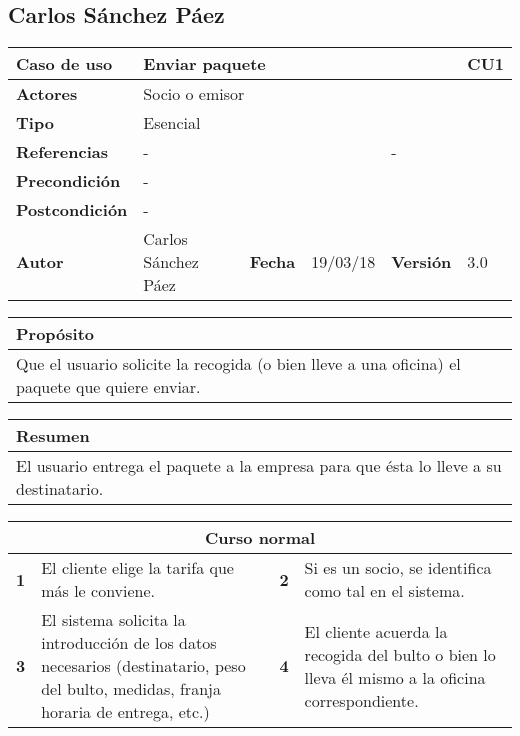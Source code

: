 \subsection{Carlos Sánchez Páez}

\begin{table}[H]
\centering
\begin{tabular}{|m{3cm}|m{4cm}|m{2cm}|m{2cm}|m{2cm}|m{1cm}|}
\hline
\textbf{Caso de uso} &  \multicolumn{4}{m{8cm}|}{Enviar paquete} \vline &  \cellcolor{gray!40}CU1 \\
\hline
\textbf{Actores} & \multicolumn{5}{m{8cm}|}{Socio o emisor} \\
\hline
\textbf{Tipo} & \multicolumn{5}{m{8cm}|}{Esencial} \\
\hline
\textbf{Referencias} &\multicolumn{3}{m{4cm}|}{-} & \multicolumn{2}{m{4cm}|}{-} \\
\hline
\textbf{Precondición} & \multicolumn{5}{m{8cm}|}{-} \\
\hline
\textbf{Postcondición} & \multicolumn{5}{m{8cm}|}{-} \\
\hline
\textbf{Autor} & Carlos Sánchez Páez & \textbf{Fecha} & 19/03/18 & \textbf{Versión} & 3.0 \\
\hline
\end{tabular}

\vspace{1cm}

\begin{tabular}{|m{16.2cm}|}
\hline
\textbf{Propósito} \\
\hline
Que el usuario solicite la recogida (o bien lleve a una oficina) el paquete que quiere enviar. \\
\hline
\end{tabular}

\vspace{1cm}

\begin{tabular}{|m{16.2cm}|}
\hline
\textbf{Resumen} \\
\hline
El usuario entrega el paquete a la empresa para que ésta lo lleve a su destinatario. \\
\hline
\end{tabular}

\vspace{1cm}

\begin{tabular}{|m{4pt}|m{7.33cm}|m{4pt}|m{7.33cm}|}
\hline
\multicolumn{4}{|c|}{\textbf{Curso normal}} \\
\hline
\textbf{1} & El cliente elige la tarifa que más le conviene. & \textbf{2} & Si es un socio, se identifica como tal en el sistema. \\
\hline
\textbf{3} & El sistema solicita la introducción de los datos necesarios (destinatario, peso del bulto, medidas, franja horaria de entrega, etc.) & \textbf{4} & El cliente acuerda la recogida del bulto o bien lo lleva él mismo a la oficina correspondiente. \\
\hline
\end{tabular}


\end{table}
